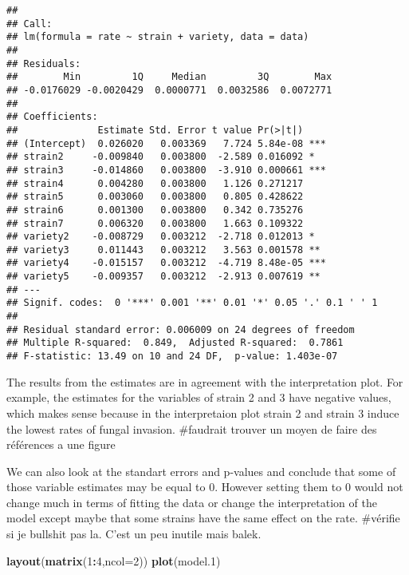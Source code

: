 \documentclass[
]{article}
\newenvironment{Shaded}{\begin{snugshade}}{\end{snugshade}}
\newcommand{\DataTypeTok}[1]{\textcolor[rgb]{0.13,0.29,0.53}{#1}}
\newcommand{\DecValTok}[1]{\textcolor[rgb]{0.00,0.00,0.81}{#1}}
\newcommand{\FloatTok}[1]{\textcolor[rgb]{0.00,0.00,0.81}{#1}}
\newcommand{\KeywordTok}[1]{\textcolor[rgb]{0.13,0.29,0.53}{\textbf{#1}}}
\newcommand{\NormalTok}[1]{#1}
\newcommand{\OperatorTok}[1]{\textcolor[rgb]{0.81,0.36,0.00}{\textbf{#1}}}
\begin{document}
\begin{verbatim}
## 
## Call:
## lm(formula = rate ~ strain + variety, data = data)
## 
## Residuals:
##        Min         1Q     Median         3Q        Max 
## -0.0176029 -0.0020429  0.0000771  0.0032586  0.0072771 
## 
## Coefficients:
##              Estimate Std. Error t value Pr(>|t|)    
## (Intercept)  0.026020   0.003369   7.724 5.84e-08 ***
## strain2     -0.009840   0.003800  -2.589 0.016092 *  
## strain3     -0.014860   0.003800  -3.910 0.000661 ***
## strain4      0.004280   0.003800   1.126 0.271217    
## strain5      0.003060   0.003800   0.805 0.428622    
## strain6      0.001300   0.003800   0.342 0.735276    
## strain7      0.006320   0.003800   1.663 0.109322    
## variety2    -0.008729   0.003212  -2.718 0.012013 *  
## variety3     0.011443   0.003212   3.563 0.001578 ** 
## variety4    -0.015157   0.003212  -4.719 8.48e-05 ***
## variety5    -0.009357   0.003212  -2.913 0.007619 ** 
## ---
## Signif. codes:  0 '***' 0.001 '**' 0.01 '*' 0.05 '.' 0.1 ' ' 1
## 
## Residual standard error: 0.006009 on 24 degrees of freedom
## Multiple R-squared:  0.849,  Adjusted R-squared:  0.7861 
## F-statistic: 13.49 on 10 and 24 DF,  p-value: 1.403e-07
\end{verbatim}

The results from the estimates are in agreement with the interpretation
plot. For example, the estimates for the variables of strain 2 and 3
have negative values, which makes sense because in the interpretaion
plot strain 2 and strain 3 induce the lowest rates of fungal invasion.
\#faudrait trouver un moyen de faire des références a une figure

We can also look at the standart errors and p-values and conclude that
some of those variable estimates may be equal to 0. However setting them
to 0 would not change much in terms of fitting the data or change the
interpretation of the model except maybe that some strains have the same
effect on the rate. \#vérifie si je bullshit pas la. C'est un peu
inutile mais balek.

\begin{Shaded}
\begin{Highlighting}[]
\KeywordTok{layout}\NormalTok{(}\KeywordTok{matrix}\NormalTok{(}\DecValTok{1}\OperatorTok{:}\DecValTok{4}\NormalTok{,}\DataTypeTok{ncol=}\DecValTok{2}\NormalTok{))}
\KeywordTok{plot}\NormalTok{(model}\FloatTok{.1}\NormalTok{)}
\end{Highlighting}
\end{Shaded}
\end{document}
